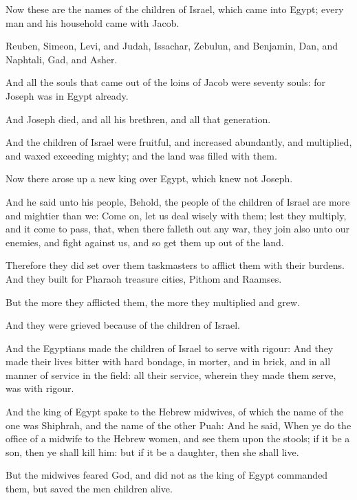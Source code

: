 

\verse Now these are the names of the children of Israel, which came into Egypt; every man and his household came with Jacob.

\verse Reuben, Simeon, Levi, and Judah, \verse Issachar, Zebulun, and Benjamin, \verse Dan, and Naphtali, Gad, and Asher.

\verse And all the souls that came out of the loins of Jacob were seventy souls: for Joseph was in Egypt already.

\verse And Joseph died, and all his brethren, and all that generation.

\verse And the children of Israel were fruitful, and increased abundantly, and multiplied, and waxed exceeding mighty; and the land was filled with them.

\verse Now there arose up a new king over Egypt, which knew not Joseph.

\verse And he said unto his people, Behold, the people of the children of Israel are more and mightier than we: \verse Come on, let us deal wisely with them; lest they multiply, and it come to pass, that, when there falleth out any war, they join also unto our enemies, and fight against us, and so get them up out of the land.

\verse Therefore they did set over them taskmasters to afflict them with their burdens. And they built for Pharaoh treasure cities, Pithom and Raamses.

\verse But the more they afflicted them, the more they multiplied and grew.

And they were grieved because of the children of Israel.

\verse And the Egyptians made the children of Israel to serve with rigour: \verse And they made their lives bitter with hard bondage, in morter, and in brick, and in all manner of service in the field: all their service, wherein they made them serve, was with rigour.

\verse And the king of Egypt spake to the Hebrew midwives, of which the name of the one was Shiphrah, and the name of the other Puah: \verse And he said, When ye do the office of a midwife to the Hebrew women, and see them upon the stools; if it be a son, then ye shall kill him: but if it be a daughter, then she shall live.

\verse But the midwives feared God, and did not as the king of Egypt commanded them, but saved the men children alive.

